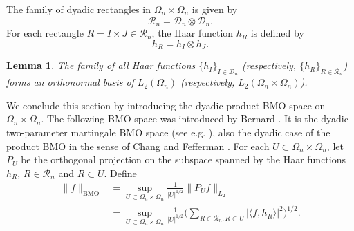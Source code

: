 \documentclass{amsart}
\numberwithin{equation}{section}
\newtheorem{lem}[thm]{Lemma}
\theoremstyle{definition}
\theoremstyle{remark}
\newcommand{\1}{\mathbf 1}
\begin{document}
\noindent The family of dyadic rectangles in $\Omega_n\times \Omega_n$ is given by
\[
\mathcal{R}_n=\mathcal{D}_n\otimes \mathcal{D}_n.
\]
For each rectangle $R=I\times J\in \mathcal{R}_{n}$, the Haar function $h_R$ is defined by 
\[
h_R=h_I\otimes h_J.
\]

\begin{lem}\label{orthonormal basis lemma}
The family of all Haar functions $\{h_I\}_{I\in \mathcal{D}_n}$ (respectively, $\{h_R\}_{R\in \mathcal{R}_n}$) forms an orthonormal basis of $L_2(\Omega_n)$ (respectively, $L_2(\Omega_n\times \Omega_n)$). 
\end{lem} 

We conclude this section by introducing the dyadic product BMO space on $\Omega_{n}\times \Omega_{n}$. The following BMO space was introduced by Bernard \cite{Bernard}. It is the dyadic two-parameter martingale BMO space (see e.g. \cite{We1994}), also the dyadic case of the product BMO in the sense of Chang and Fefferman \cite{CF1980}.
For each $U\subset \Omega_n\times \Omega_n$, let $P_{U}$ be the orthogonal projection on the subspace spanned by the Haar functions $h_R$, $R\in \mathcal{R}_{n}$ and $R\subset U$. Define
\begin{align*}
	\|f\|_{\mathrm{BMO}}&=\sup_{U\subset  \Omega_n\times \Omega_n}\frac{1}{|U|^{1/2}}\|P_{U}f\|_{L_2}\\
	&=\sup_{U\subset  \Omega_n\times \Omega_n}\frac{1}{|U|^{1/2}} \Big(\sum_{R\in \mathcal{R}_{n}, R\subset U} |\langle f, h_R\rangle|^2\Big)^{1/2}.
\end{align*}



 
\end{document}
